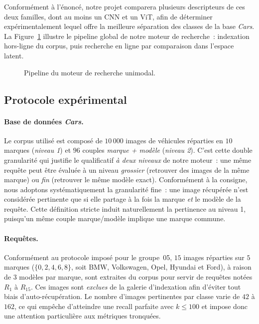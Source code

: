 \documentclass[a4paper,11pt]{article}
\begin{document}
Conformément à l'énoncé, notre projet comparera plusieurs descripteurs de 
ces deux familles, dont au moins un CNN et un ViT, afin de déterminer 
expérimentalement lequel offre la meilleure séparation des classes de la 
base \textit{Cars}. La Figure~\ref{fig:cbir_pipeline} illustre le pipeline 
global de notre moteur de recherche~: indexation hors-ligne du corpus, 
puis recherche en ligne par comparaison dans l'espace latent.

\begin{figure}[h]
    \centering
    
    \caption{Pipeline du moteur de recherche unimodal.}
    \label{fig:cbir_pipeline}
\end{figure}

\subsection{Protocole expérimental}
\label{subsec:protocole}

\paragraph{Base de données \textit{Cars}.}
Le corpus utilisé est composé de $10\,000$ images de véhicules réparties
en $10$ marques (\textit{niveau 1}) et $96$ couples
\textit{marque + modèle} (\textit{niveau 2}). C'est cette double
granularité qui justifie le qualificatif \emph{à deux niveaux} de notre
moteur~: une même requête peut être évaluée à un niveau \emph{grossier}
(retrouver des images de la même marque) ou \emph{fin} (retrouver le même
modèle exact). Conformément à la consigne, nous adoptons systématiquement
la granularité fine~: une image récupérée n'est considérée pertinente que
si elle partage à la fois la marque \emph{et} le modèle de la requête.
Cette définition stricte induit naturellement la pertinence au niveau 1,
puisqu'un même couple marque/modèle implique une marque commune.

\paragraph{Requêtes.}
Conformément au protocole imposé pour le groupe~05, $15$ images réparties
sur $5$ marques ($\{0,2,4,6,8\}$, soit BMW, Volkswagen, Opel, Hyundai et
Ford), à raison de $3$ modèles par marque, sont extraites du corpus pour
servir de requêtes notées $R_1$ à $R_{15}$. Ces images sont \emph{exclues}
de la galerie d'indexation afin d'éviter tout biais d'auto-récupération.
Le nombre d'images pertinentes par classe varie de $42$ à $162$, ce qui
empêche d'atteindre une recall parfaite avec $k\le 100$ et impose donc une
attention particulière aux métriques tronquées.
\end{document}
